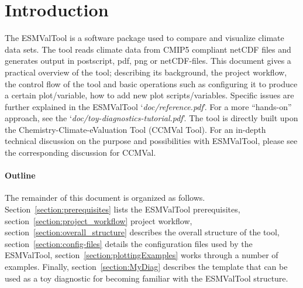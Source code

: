 \documentclass[12pt]{article}
\newcommand{\docref}[1]{`\emph{#1}'}
\begin{document}
\maketitle

% 
% 
\section{Introduction}\label{section:introduction}
The ESMValTool is a software package used to compare and visualize
climate data sets. The tool reads climate data from CMIP5 compliant
netCDF files and generates output in postscript, pdf, png or
netCDF-files. This document gives a practical overview of the tool;
describing its background, the project workflow, the control flow of
the tool and basic operations such as configuring it to produce a
certain plot/variable, how to add new plot scripts/variables. Specific
issues are further explained in  the ESMValTool
\docref{doc/reference.pdf}. For a more ``hands-on'' approach, see the
\docref{doc/toy-diagnostics-tutorial.pdf}. The tool is directly built
upon the Chemistry-Climate-eValuation Tool\cite{CCMVal-main:2012}
(CCMVal Tool). For an in-depth technical discussion on the purpose and
possibilities with ESMValTool, please see the corresponding discussion
for CCMVal\cite{CCMVal-main:2012}. 

\paragraph*{Outline}
The remainder of this document is organized as follows.
Section~\ref{section:prerequisites} lists the ESMValTool
prerequisites, section~\ref{section:project_workflow} project
workflow, section~\ref{section:overall_structure} describes the
overall structure of the tool, section~\ref{section:config-files}
details the configuration files used by the ESMValTool,
section~\ref{section:plottingExamples} works through a number of
examples. Finally, section~\ref{section:MyDiag} describes the template
that can be used as a toy diagnostic for becoming familiar with the
ESMValTool structure.


% 
% 
\end{document}
